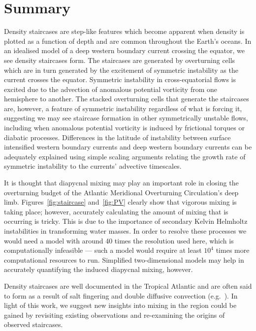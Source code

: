 \section{Summary}
\label{sec:conc}
Density staircases are step-like features which become apparent when density is plotted as a function of depth and are common throughout the Earth's oceans. In an idealised model of a deep western boundary current crossing the equator, we see density staircases form. The staircases are generated by overturning cells which are in turn generated by the excitement of symmetric instability as the current crosses the equator. Symmetric instability in cross-equatorial flows is excited due to the advection of anomalous potential vorticity from one hemisphere to another. The stacked overturning cells that generate the staircases are, however, a feature of symmetric instability regardless of what is forcing it, suggesting we may see staircase formation in other symmetrically unstable flows, including when anomalous potential vorticity is induced by frictional torques or diabatic processes. Differences in the latitude of instability between surface intensified western boundary currents and deep western boundary currents can be adequately explained using simple scaling arguments relating the growth rate of symmetric instability to the currents' advective timescales.

It is thought that diapycnal mixing may play an important role in closing the overturning budget of the Atlantic Meridional Overturning Circulation's deep limb. Figures~\ref{fig:staircase} and~\ref{fig:PV} clearly show that vigorous mixing is taking place; however, accurately calculating the amount of mixing that is occurring is tricky. This is due to the importance of secondary Kelvin Helmholtz instabilities in transforming water masses. In order to resolve these processes we would need a model with around 40 times the resolution used here, which is computationally infeasible --- such a model would require at least $10^4$ times more computational resources to run. Simplified two-dimensional models may help in accurately quantifying the induced diapycnal mixing, however.

Density staircases are well documented in the Tropical Atlantic and are often said to form as a result of salt fingering and double diffusive convection (e.g.~\citet{Schmitt1987, Schmitt2005}). In light of this work, we suggest new insights into mixing in the region could be gained by revisiting existing observations and re-examining the origins of observed staircases.

